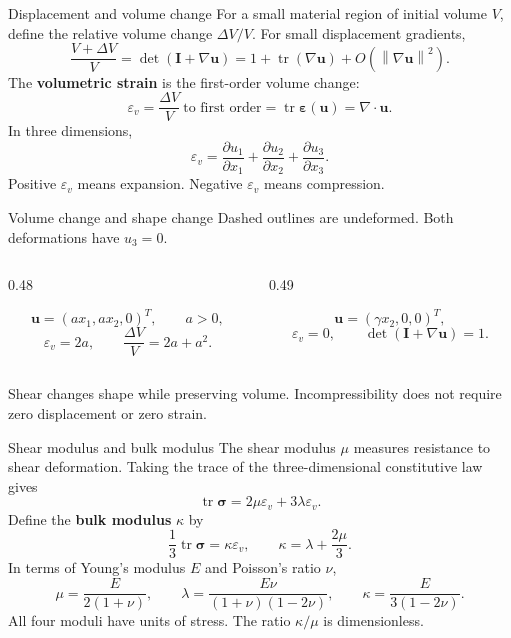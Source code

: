 \documentclass[11pt,aspectratio=169]{beamer}
\newcommand{\bu}{\bm u}
\newcommand{\bI}{\bm I}
\newcommand{\beps}{\bm\varepsilon}
\newcommand{\bsig}{\bm\sigma}
\newcommand{\divg}{\nabla\!\cdot}
\newcommand{\norm}[2][]{\left\lVert#2\right\rVert_{#1}}
\DeclareMathOperator{\tr}{tr}
\begin{document}
\begin{frame}{Displacement and volume change}
For a small material region of initial volume $V$, define the relative
volume change $\Delta V/V$. For small displacement gradients,
\[
\frac{V+\Delta V}{V}=\det(\bI+\nabla\bu)
=1+\tr(\nabla\bu)+O(\norm{\nabla\bu}^2).
\]
The \textbf{volumetric strain} is the first-order volume change:
\[
\boxed{\varepsilon_v=\frac{\Delta V}{V}\ \text{to first order}
=\tr\beps(\bu)=\divg\bu.}
\]
In three dimensions,
\[
\varepsilon_v=\frac{\partial u_1}{\partial x_1}
+\frac{\partial u_2}{\partial x_2}
+\frac{\partial u_3}{\partial x_3}.
\]
Positive $\varepsilon_v$ means expansion. Negative $\varepsilon_v$ means compression.
\end{frame}

\begin{frame}{Volume change and shape change}
Dashed outlines are undeformed. Both deformations have $u_3=0$.
\begin{columns}[T,onlytextwidth]
\begin{column}{0.48\textwidth}
\centering
{}
\[
\bu=(a x_1,a x_2,0)^T,\qquad a>0,
\]
\[
\varepsilon_v=2a,\qquad
\frac{\Delta V}{V}=2a+a^2.
\]
\end{column}
\begin{column}{0.49\textwidth}
\centering
{}
\[
\bu=(\gamma x_2,0,0)^T,
\]
\[
\varepsilon_v=0,\qquad \det(\bI+\nabla\bu)=1.
\]
\end{column}
\end{columns}
Shear changes shape while preserving volume. Incompressibility does not
require zero displacement or zero strain.
\end{frame}

\begin{frame}{Shear modulus and bulk modulus}
The shear modulus $\mu$ measures resistance to shear deformation.
Taking the trace of the three-dimensional constitutive law gives
\[
\tr\bsig=2\mu\varepsilon_v+3\lambda\varepsilon_v.
\]
Define the \textbf{bulk modulus} $\kappa$ by
\[
\boxed{\frac13\tr\bsig=\kappa\varepsilon_v,
\qquad \kappa=\lambda+\frac{2\mu}{3}.}
\]
In terms of Young's modulus $E$ and Poisson's ratio $\nu$,
\[
\mu=\frac{E}{2(1+\nu)},\qquad
\lambda=\frac{E\nu}{(1+\nu)(1-2\nu)},\qquad
\kappa=\frac{E}{3(1-2\nu)}.
\]
All four moduli have units of stress. The ratio $\kappa/\mu$ is dimensionless.
\end{frame}
\end{document}
